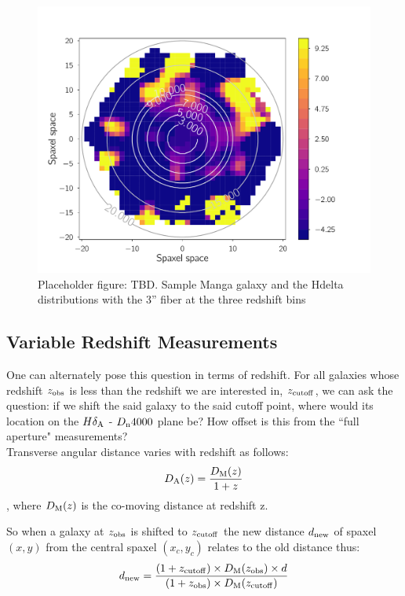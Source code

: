 \begin{figure}
\includegraphics[width=\textwidth]{figures/gal_aperture.pdf}
\caption[Short figure name.]{ Placeholder figure: TBD. Sample Manga galaxy and the Hdelta distributions with the 3'' fiber at the three redshift bins
\label{fig:sample_manga}}
\end{figure}

\subsection{Variable Redshift Measurements}
One can alternately pose this question in terms of redshift. For all galaxies whose redshift $z_{\rm obs}$ is less than the redshift we are interested in, $z_{\rm cutoff}$, we can ask the question: if we shift the said galaxy to the said cutoff point, where would its location on the $H\delta_{\rm A}$ - $D_{\rm n}4000$ plane be? How offset is this from the ``full aperture" measurements?\\

Transverse angular distance varies with redshift as follows:
$$D_{\rm A}(z) = \frac{D_{\rm M}(z)}{1+z} $$,
where $D_{\rm M}(z)$ is the co-moving distance at redshift z.

So when a galaxy at $z_{\rm obs}$ is shifted to $z_{\rm cutoff}$ the new distance $d_{\rm new}$ of spaxel $(x,y)$ from the central spaxel $(x_{c},y_{c})$ relates to the old distance thus:
$$ d_{\rm new} = \frac{(1+z_{\rm cutoff})\times D_{\rm M}(z_{\rm obs}) \times d}{(1+z_{\rm obs}) \times  D_{\rm M}(z_{\rm cutoff})} $$


